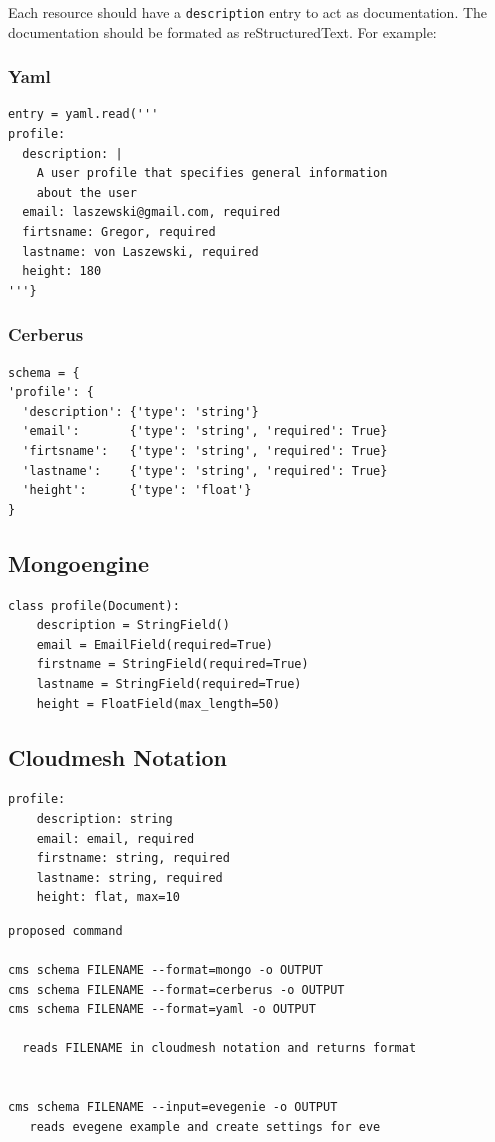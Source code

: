 \documentclass[10pt]{article}
\begin{document}
Each resource should have a \verb+description+ entry to act as
documentation. The documentation should be formated as
reStructuredText. For example:

\subsubsection{Yaml}

\begin{Verbatim}
entry = yaml.read('''
profile:
  description: |
    A user profile that specifies general information 
    about the user
  email: laszewski@gmail.com, required
  firtsname: Gregor, required
  lastname: von Laszewski, required
  height: 180
'''}
\end{Verbatim}

\subsubsection{Cerberus}

\begin{Verbatim}
schema = {
'profile': {
  'description': {'type': 'string'}
  'email':       {'type': 'string', 'required': True}
  'firtsname':   {'type': 'string', 'required': True}
  'lastname':    {'type': 'string', 'required': True}
  'height':      {'type': 'float'}
}
\end{Verbatim}

\subsection{Mongoengine}

\begin{Verbatim}
class profile(Document):
    description = StringField()
    email = EmailField(required=True)
    firstname = StringField(required=True)
    lastname = StringField(required=True)
    height = FloatField(max_length=50)
\end{Verbatim}

\subsection{Cloudmesh Notation}

\begin{Verbatim}
profile:
    description: string
    email: email, required
    firstname: string, required
    lastname: string, required
    height: flat, max=10
\end{Verbatim}

\begin{Verbatim}
proposed command

cms schema FILENAME --format=mongo -o OUTPUT
cms schema FILENAME --format=cerberus -o OUTPUT
cms schema FILENAME --format=yaml -o OUTPUT

  reads FILENAME in cloudmesh notation and returns format


cms schema FILENAME --input=evegenie -o OUTPUT
   reads evegene example and create settings for eve
\end{Verbatim}
\end{document}
